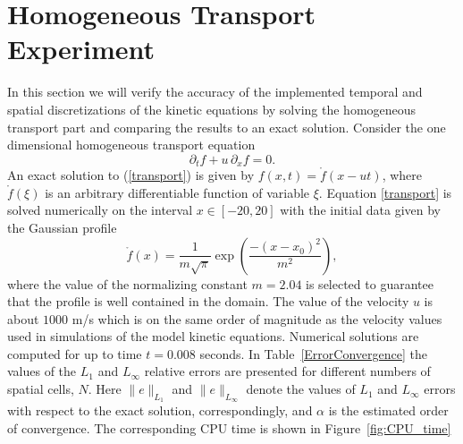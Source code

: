 \section{Homogeneous Transport Experiment}
In this section we will verify the accuracy of the implemented temporal and spatial discretizations of the kinetic equations by solving the homogeneous transport part and comparing the results to an exact solution. Consider the one dimensional homogeneous transport equation
%
\begin{equation}
\label{transport}
\partial_{t} f + u\, \partial_{x} f = 0.
\end{equation}
%
An exact solution to (\ref{transport}) is given by $f(x,t) = \mathring{f}(x - u t)$, where $\mathring{f}(\xi)$ is an arbitrary differentiable function of variable $\xi$. Equation \ref{transport} is solved numerically on the interval $x \in [-20,20]$ with the initial data given by the Gaussian profile
%
\begin{equation}
\mathring{f}(x)= \frac{1}{m \sqrt{\pi}}\exp \left( \frac{-(x-x_{0})^2}{m^2} \right),
\end{equation}
%
where the value of the normalizing constant $m=2.04$ is selected to guarantee that the profile is well contained in the domain. The value of the velocity $u$ is about $1000$ m/s which is on the same order of magnitude as the velocity values used in simulations of the model kinetic equations. Numerical solutions are computed for up to time $t = 0.008$ seconds. In Table~\ref{ErrorConvergence} the values of the $L_{1}$ and $L_{\infty}$ relative errors are presented for different numbers of spatial cells, $N$. Here $\|e\|_{L_{1}}$ and $\| e \|_{L_{\infty}}$ denote the values of $L_{1}$ and $L_{\infty}$ errors with respect to the exact solution, correspondingly, and $\alpha$ is the estimated order of convergence. The corresponding CPU time is shown in Figure~\ref{fig:CPU_time}
%

